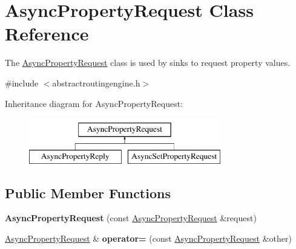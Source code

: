 \hypertarget{classAsyncPropertyRequest}{\section{Async\-Property\-Request Class Reference}
\label{classAsyncPropertyRequest}
}


The \hyperlink{classAsyncPropertyRequest}{Async\-Property\-Request} class is used by sinks to request property values.  




{\ttfamily \#include $<$abstractroutingengine.\-h$>$}

Inheritance diagram for Async\-Property\-Request\-:\begin{figure}[H]
\begin{center}
\leavevmode
\includegraphics[height=2.000000cm]{classAsyncPropertyRequest}
\end{center}
\end{figure}
\subsection*{Public Member Functions}
\begin{DoxyCompactItemize}
\item 
\hypertarget{classAsyncPropertyRequest_ad46cfdd3411c11beaa00b70d1c6419d9}{{\bfseries Async\-Property\-Request} (const \hyperlink{classAsyncPropertyRequest}{Async\-Property\-Request} \&request)}\label{classAsyncPropertyRequest_ad46cfdd3411c11beaa00b70d1c6419d9}

\item 
\hypertarget{classAsyncPropertyRequest_ad1de0c87f190106cf70a996e5cba1088}{\hyperlink{classAsyncPropertyRequest}{Async\-Property\-Request} \& {\bfseries operator=} (const \hyperlink{classAsyncPropertyRequest}{Async\-Property\-Request} \&other)}\label{classAsyncPropertyRequest_ad1de0c87f190106cf70a996e5cba1088}

\end{DoxyCompactItemize}
